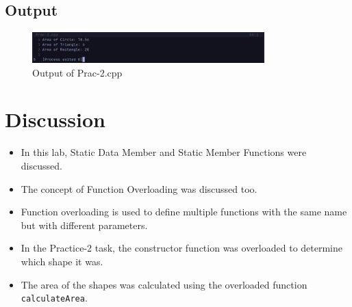 \documentclass[12pt]{article}
\begin{document}
\subsection*{Output}
\begin{figure}[htpb]
    \centering
    \includegraphics[width=0.8\textwidth]{Prac-2.png}
    \caption{Output of Prac-2.cpp}
\end{figure}


\FloatBarrier
\section*{Discussion}
\begin{itemize}
    \item In this lab, Static Data Member and Static Member Functions were discussed. 
    \item The concept of Function Overloading was discussed too. 
    \item Function overloading is used to define multiple functions with the same name but with different parameters. 
    \item In the Practice-2 task, the constructor function was overloaded to determine which shape it was. 
    \item The area of the shapes was calculated using the overloaded function \texttt{calculateArea}.
\end{itemize}
\end{document}
